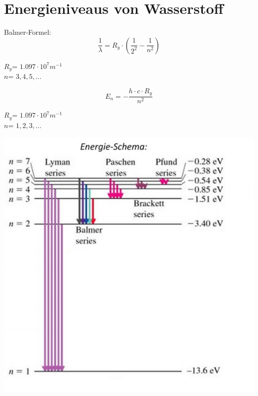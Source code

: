 \section{Energieniveaus von Wasserstoff}
Balmer-Formel:
\[
	\frac{1}{\lambda}=R_y\cdot \left( \frac{1}{2^2} - \frac{1}{n^2}\right) 
\]
\begin{footnotesize}
	$R_y$=	$1.097\cdot 10^7 m^{-1}$\\
	$n$=	$3,4,5,...$ \\
\end{footnotesize}
\[
	E_n= -\frac{h\cdot c \cdot R_y}{n^2}
\]
\begin{footnotesize}
	$R_y$=	$1.097\cdot 10^7 m^{-1}$\\
	$n$=	$1,2,3,...$ \\
\end{footnotesize}
\begin{center}
	\includegraphics[scale = 0.25]{../fig/en_H.jpg}
\end{center}
\
